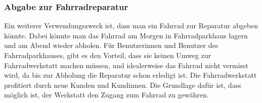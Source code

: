 \subsubsection{Abgabe zur Fahrradreparatur}
Ein weiterer Verwendungszweck ist, dass man ein Fahrrad zur Reparatur abgeben könnte. Dabei könnte man das Fahrrad am Morgen in Fahrradparkhaus lagern und am Abend wieder abholen. Für Benutzerinnen und Benutzer des Fahrradparkhauses, gibt es den Vorteil, dass sie keinen Umweg zur Fahrradwerkstatt machen müssen, und idealerweise das Fahrrad nicht vermisst wird, da bis zur Abholung die Reparatur schon erledigt ist. Die Fahrradwerkstatt profitiert durch neue Kunden und Kundinnen. Die Grundlage dafür ist, dass möglich ist, der Werkstatt den Zugang zum Fahrrad zu gewähren.\\